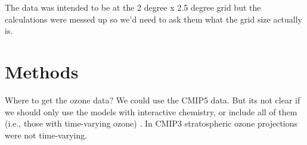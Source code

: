 \documentclass[10pt]{amsart}
\begin{document}
The data was intended to be at the 2 degree x 2.5 degree grid but the calculations were messed up so we'd need to ask them what the grid size actually is. 


\section{Methods}
Where to get the ozone data?
We could use the CMIP5 data.
But its not clear if we should only use the models with interactive chemistry, or include all of them (i.e., those with time-varying ozone) \parencite{eyring2013long}.
In CMIP3 stratospheric ozone projections were not time-varying. 

\printbibliography
\end{document}
